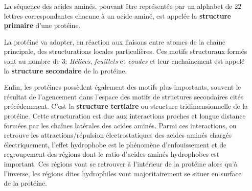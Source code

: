 

La séquence des acides aminés, pouvant être représentée par un alphabet de 22 lettres correspondantes chacune à un acide aminé, est appelée la \textbf{structure primaire} d'une protéine.

La protéine va adopter, en réaction aux liaisons entre atomes de la chaîne principale, des structurations locales particulières. Ces motifs structuraux formés sont au nombre de 3: \textit{Hélices}, \textit{feuillets} et \textit{coudes} et leur enchaînement est appelé la \textbf{structure secondaire} de la protéine.

Enfin, les protéines possèdent également des motifs plus importants, souvent le résultat de l'agencement dans l'espace des motifs de structures secondaires cités précédemment. C'est la \textbf{structure tertiaire} ou structure tridimensionnelle de la protéine. 
Cette structuration est due aux interactions proches et longue distance formées par les chaînes latérales des acides aminés. Parmi ces interactions, on retrouve les attractions/répulsion électrostatiques des acides aminés chargés électriquement, l'effet hydrophobe est le phénomène d'enfouissement et de regroupement des régions dont le ratio d'acides aminés hydrophobes est important. Ces régions vont se retrouver à l'intérieur de la protéine alors qu'à l'inverse, les régions dites hydrophiles vont majoritairement se situer en surface de la protéine.

